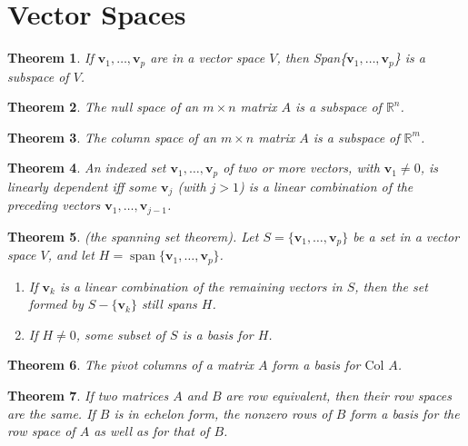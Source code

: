 \documentclass{article}
\theoremstyle{plain}
\newtheorem{thm}{Theorem}[section]
\theoremstyle{definition}
\theoremstyle{remark}
\DeclareMathOperator{\spn}{span}
\begin{document}
\section{Vector Spaces}

\begin{thm}
    If $\textbf{v}_1,\ldots,\textbf{v}_p$ are in a vector space $V$, then Span\{$\textbf{v}_1,\ldots,\textbf{v}_p$\} is a subspace of $V$.
\end{thm}

\begin{thm}
    The null space of an $m\times n$ matrix $A$ is a subspace of $\mathbb{R}^n$.
\end{thm}

\begin{thm}
    The column space of an $m\times n$ matrix $A$ is a subspace of $\mathbb{R}^m$.
\end{thm}

\begin{thm}
    An indexed set \(\textbf{v}_1,\ldots,\textbf{v}_p\) of two or more vectors, with \(\textbf{v}_1\neq0\), is linearly dependent iff some \(\textbf{v}_j\) (with \(j>1\)) is a linear combination of the preceding vectors \(\textbf{v}_1,\ldots,\textbf{v}_{j-1}\).
\end{thm}

\begin{thm} (the spanning set theorem).
    Let \(S=\{\textbf{v}_1,\ldots,\textbf{v}_p\}\) be a set in a vector space \(V\), and let \(H=\spn\{\textbf{v}_1,\ldots,\textbf{v}_p\}\).
    \begin{enumerate}
        \item[a.] If \(\textbf{v}_k\) is a linear combination of the remaining vectors in \(S\), then the set formed by \(S-\{\textbf{v}_k\}\) still spans \(H\).
        \item[b.] If \(H\neq0\), some subset of \(S\) is a basis for \(H\).
    \end{enumerate}
\end{thm}

\begin{thm}
    The pivot columns of a matrix \(A\) form a basis for \(\text{Col }A\).
\end{thm}

\begin{thm}
    If two matrices \(A\) and \(B\) are row equivalent, then their row spaces are the same. If \(B\) is in echelon form, the nonzero rows of \(B\) form a basis for the row space of \(A\) as well as for that of \(B\).
\end{thm}
\end{document}
